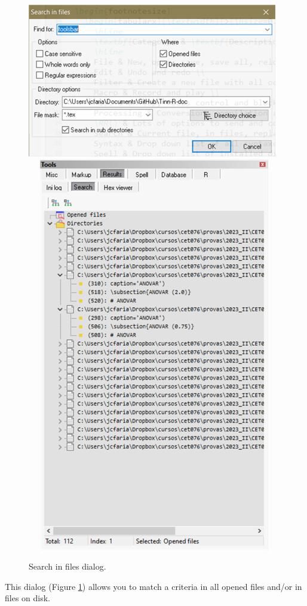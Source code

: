 \begin{figure}[H]
  \includegraphics[scale=0.8]{./res/dlg_search_in_files.png}~~
  \includegraphics[scale=0.8]{./res/tools_results_search.png}\\
  \caption{Search in files dialog.}
  \label{fig:dlg_search_in_files}
\end{figure}
This dialog
(Figure \ref{fig:dlg_search_in_files})
allows you to match a criteria in all opened files and/or in files on disk.

